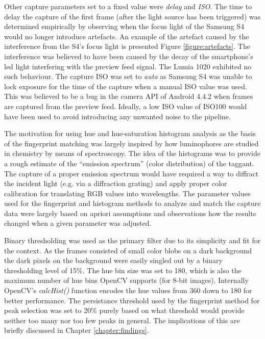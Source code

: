 \documentclass[thesis.tex]{subfiles}
\begin{document}
Other capture parameters set to a fixed value were \emph{delay} and \emph{ISO}. The time to delay the capture of the first frame (after the light source has been triggered) was determined empirically by observing when the focus light of the Samsung S4 would no longer introduce artefacts. An example of the artefact caused by the interference from the S4's focus light is presented Figure \ref{figure:artefacts}. The interference was believed to have been caused by the decay of the smartphone's led light interfering with the preview feed signal. The Lumia 1020 exhibited no such behaviour. The capture ISO was set to \emph{auto} as Samsung S4 was unable to lock exposure for the time of the capture when a manual ISO value was used. This was believed to be a bug in the camera API of Android 4.4.2 when frames are captured from the preview feed. Ideally, a low ISO value of ISO100 would have been used to avoid introducing any unwanted noise to the pipeline.

The motivation for using hue and hue-saturation histogram analysis as the basis of the fingerprint matching was largely inspired by how luminophores are studied in chemistry by means of spectroscopy. The idea of the histograms was to provide a rough estimate of the ``emission spectrum'' (color distribution) of the taggant. The capture of a proper emission spectrum would have required a way to diffract the incident light (e.g. via a diffraction grating) and apply proper color calibration for translating RGB values into wavelengths. The parameter values used for the fingerprint and histogram methods to analyze and match the capture data were largely based on apriori assumptions and observations how the results changed when a given parameter was adjusted.

Binary thresholding was used as the primary filter due to its simplicity and fit for the context. As the frames consisted of small color blobs on a dark background the dark pixels on the background were easily singled out by a binary thresholding level of 15\%. The hue bin size was set to 180, which is also the maximum number of hue bins OpenCV supports (for 8-bit images). Internally OpenCV's \emph{calcHist()} function encodes the hue values from 360 down to 180 for better performance. The persistance threshold used by the fingerprint method for peak selection was set to 20\% purely based on what threshold would provide neither too many nor too few peaks in general. The implications of this are briefly discussed in Chapter \ref{chapter:findings}.
\end{document}

